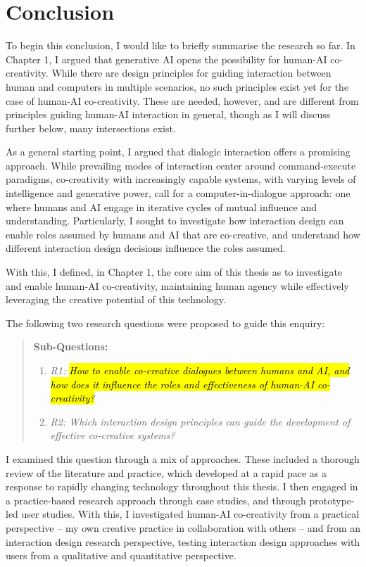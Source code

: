 
\chapter[Conclusion]{Conclusion}\label{c:conclusion}

To begin this conclusion, I would like to briefly summarise the research so far. In Chapter 1, I argued that generative AI opens the possibility for human-AI co-creativity. While there are design principles for guiding interaction between human and computers in multiple scenarios, no such principles exist yet for the case of human-AI co-creativity. These are needed, however, and are different from principles guiding human-AI interaction in general, though as I will discuss further below, many intersections exist.

As a general starting point, I argued that dialogic interaction offers a promising approach. While prevailing modes of interaction center around command-execute paradigms, co-creativity with increasingly capable systems, with varying levels of intelligence and generative power, call for a computer-in-dialogue approach: one where humans and AI engage in iterative cycles of mutual influence and understanding. Particularly, I sought to investigate how interaction design can enable roles assumed by humans and AI that are co-creative, and understand how different interaction design decisions influence the roles assumed.

With this, I defined, in Chapter 1, the core aim of this thesis as to investigate and enable human-AI co-creativity, maintaining human agency while effectively leveraging the creative potential of this technology.

The following two research questions were proposed to guide this enquiry:

\begin{quote}
\textbf{Sub-Questions:}
\begin{enumerate}
    \item \emph{R1: \hl{How to enable co-creative dialogues between humans and AI, and how does it influence the roles and effectiveness of human-AI co-creativity?}}
    \item \emph{R2: Which interaction design principles can guide the development of effective co-creative systems?}
\end{enumerate}
\end{quote}

I examined this question through a mix of approaches. These included a thorough review of the literature and practice, which developed at a rapid pace as a response to rapidly changing technology throughout this thesis. I then engaged in a practice-based research approach through case studies, and through prototype-led user studies. With this, I investigated human-AI co-creativity from a practical perspective -- my own creative practice in collaboration with others -- and from an interaction design research perspective, testing interaction design approaches with users from a qualitative and quantitative perspective.

